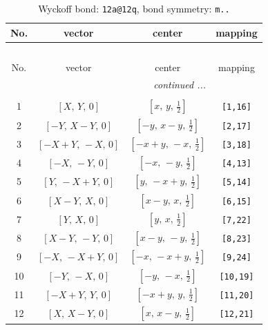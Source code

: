 \documentclass[fleqn,8pt]{jsarticle}
\begin{document}
\begin{longtable}{cccc}
\caption{Wyckoff bond: {\tt 12a@12q}, bond symmetry: {\tt m..}}
 \\
 \hline \hline
No. & vector & center & mapping \\ \hline \endfirsthead

\multicolumn{3}{l}{\tablename\ \thetable{}} \\
 \hline \hline
No. & vector & center & mapping \\ \hline \endhead

 \hline \hline
\multicolumn{3}{r}{\footnotesize\it continued ...} \\ \endfoot

 \hline \hline
\multicolumn{3}{r}{} \\ \endlastfoot

1 & $\left[ X,\, Y,\, 0 \right]$ & $\left[ x,\, y,\, \frac{1}{2} \right]$ & {\tt [1,16]} \\ \hline
2 & $\left[ - Y,\, X - Y,\, 0 \right]$ & $\left[ - y,\, x - y,\, \frac{1}{2} \right]$ & {\tt [2,17]} \\ \hline
3 & $\left[ - X + Y,\, - X,\, 0 \right]$ & $\left[ - x + y,\, - x,\, \frac{1}{2} \right]$ & {\tt [3,18]} \\ \hline
4 & $\left[ - X,\, - Y,\, 0 \right]$ & $\left[ - x,\, - y,\, \frac{1}{2} \right]$ & {\tt [4,13]} \\ \hline
5 & $\left[ Y,\, - X + Y,\, 0 \right]$ & $\left[ y,\, - x + y,\, \frac{1}{2} \right]$ & {\tt [5,14]} \\ \hline
6 & $\left[ X - Y,\, X,\, 0 \right]$ & $\left[ x - y,\, x,\, \frac{1}{2} \right]$ & {\tt [6,15]} \\ \hline
7 & $\left[ Y,\, X,\, 0 \right]$ & $\left[ y,\, x,\, \frac{1}{2} \right]$ & {\tt [7,22]} \\ \hline
8 & $\left[ X - Y,\, - Y,\, 0 \right]$ & $\left[ x - y,\, - y,\, \frac{1}{2} \right]$ & {\tt [8,23]} \\ \hline
9 & $\left[ - X,\, - X + Y,\, 0 \right]$ & $\left[ - x,\, - x + y,\, \frac{1}{2} \right]$ & {\tt [9,24]} \\ \hline
10 & $\left[ - Y,\, - X,\, 0 \right]$ & $\left[ - y,\, - x,\, \frac{1}{2} \right]$ & {\tt [10,19]} \\ \hline
11 & $\left[ - X + Y,\, Y,\, 0 \right]$ & $\left[ - x + y,\, y,\, \frac{1}{2} \right]$ & {\tt [11,20]} \\ \hline
12 & $\left[ X,\, X - Y,\, 0 \right]$ & $\left[ x,\, x - y,\, \frac{1}{2} \right]$ & {\tt [12,21]} \\
\end{longtable}
\end{document}
